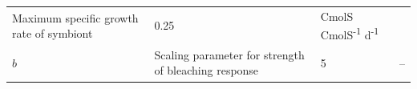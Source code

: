 \documentclass[]{elsarticle} %
\begin{document}
\begin{longtable}[c]{@{}llll@{}}
\begin{minipage}[t]{0.48\columnwidth}\raggedright\strut
Maximum specific growth rate of symbiont
\strut\end{minipage} &
\begin{minipage}[t]{0.09\columnwidth}\raggedright\strut
0.25
\strut\end{minipage} &
\begin{minipage}[t]{0.23\columnwidth}\raggedright\strut
CmolS CmolS\textsuperscript{-1} d\textsuperscript{-1}
\strut\end{minipage}\tabularnewline
\begin{minipage}[t]{0.10\columnwidth}\raggedright\strut
\(b\)
\strut\end{minipage} &
\begin{minipage}[t]{0.48\columnwidth}\raggedright\strut
Scaling parameter for strength of bleaching response
\strut\end{minipage} &
\begin{minipage}[t]{0.09\columnwidth}\raggedright\strut
5
\strut\end{minipage} &
\begin{minipage}[t]{0.23\columnwidth}\raggedright\strut
--
\strut\end{minipage}\tabularnewline
\bottomrule
\end{longtable}
\end{document}
